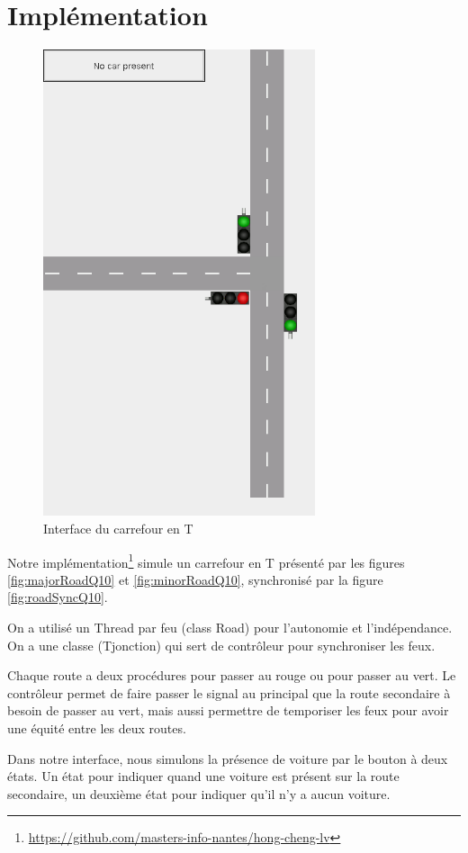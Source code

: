 \documentclass[pdftex,12pt,a4paper]{article}
\begin{document}
\section{Implémentation}

\begin{figure}[H]
  \centering
  \includegraphics[width=8cm, angle=90]{ressources/impl/Tjunction.png}
  \caption{\label{fig:screenshot} Interface du carrefour en T}
\end{figure}


Notre implémentation\footnote{\url{https://github.com/masters-info-nantes/hong-cheng-lv}} simule un carrefour en T présenté par les figures \ref{fig:majorRoadQ10} et \ref{fig:minorRoadQ10}, synchronisé par la figure \ref{fig:roadSyncQ10}.

On a utilisé un Thread par feu (class Road) pour l'autonomie et l'indépendance.
On a une classe (Tjonction) qui sert de contrôleur pour synchroniser les feux.

Chaque route a deux procédures pour passer au rouge ou pour passer au vert. Le contrôleur permet de faire passer le signal au principal que la route secondaire à besoin de passer au vert, mais aussi permettre de temporiser les feux pour avoir une équité entre les deux routes.

Dans notre interface, nous simulons la présence de voiture par le bouton à deux états.
Un état pour indiquer quand une voiture est présent sur la route secondaire, un deuxième état pour indiquer qu'il n'y a aucun voiture.
\end{document}
